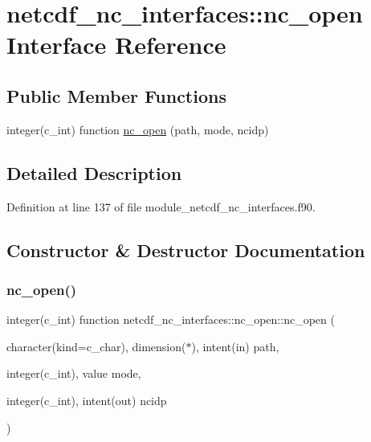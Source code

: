 \hypertarget{interfacenetcdf__nc__interfaces_1_1nc__open}{}\section{netcdf\+\_\+nc\+\_\+interfaces\+:\+:nc\+\_\+open Interface Reference}
\label{interfacenetcdf__nc__interfaces_1_1nc__open}
\subsection*{Public Member Functions}
\begin{DoxyCompactItemize}
\item 
integer(c\+\_\+int) function \hyperlink{interfacenetcdf__nc__interfaces_1_1nc__open_abe21aeae45580fab973ec606be91047a}{nc\+\_\+open} (path, mode, ncidp)
\end{DoxyCompactItemize}


\subsection{Detailed Description}


Definition at line 137 of file module\+\_\+netcdf\+\_\+nc\+\_\+interfaces.\+f90.



\subsection{Constructor \& Destructor Documentation}
\mbox{\label{interfacenetcdf__nc__interfaces_1_1nc__open_abe21aeae45580fab973ec606be91047a}} 
\subsubsection{\texorpdfstring{nc\+\_\+open()}{nc\_open()}}
{\footnotesize\ttfamily integer(c\+\_\+int) function netcdf\+\_\+nc\+\_\+interfaces\+::nc\+\_\+open\+::nc\+\_\+open (\begin{DoxyParamCaption}\item[{character(kind=c\+\_\+char), dimension($\ast$), intent(in)}]{path,  }\item[{integer(c\+\_\+int), value}]{mode,  }\item[{integer(c\+\_\+int), intent(out)}]{ncidp }\end{DoxyParamCaption})}



